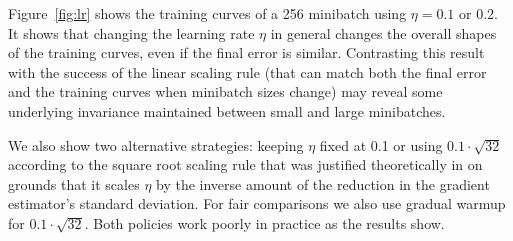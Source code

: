 \documentclass[10pt,twocolumn,letterpaper]{article}
\begin{document}
Figure~\ref{fig:lr} shows the training curves of a 256 minibatch using $\eta=0.1$ or $0.2$. It shows that changing the learning rate $\eta$ in general changes the overall shapes of the training curves, even if the final error is similar. Contrasting this result with the success of the linear scaling rule (that can match both the final error and the training curves when minibatch sizes change) may reveal some underlying invariance maintained between small and large minibatches.

We also show two alternative strategies: keeping $\eta$ fixed at 0.1 or using $0.1 \cdot \sqrt{32}$ according to the square root scaling rule that was justified theoretically in \cite{Krizhevsky2014} on grounds that it scales $\eta$ by the inverse amount of the reduction in the gradient estimator's standard deviation. For fair comparisons we also use gradual warmup for $0.1 \cdot \sqrt{32}$. Both policies work poorly in practice as the results show.
\end{document}
